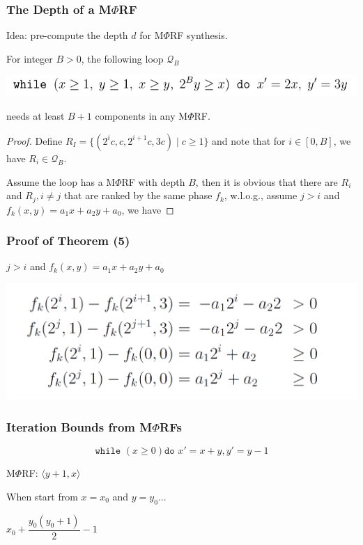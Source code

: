 \documentclass[11pt]{beamer}
\begin{document}
\begin{frame}\frametitle{The Depth of a M$\Phi$RF}
Idea: pre-compute the depth $d$ for M$\Phi$RF synthesis.

\begin{theorem}[5]
For integer $B > 0$, the following loop $\mathcal{Q}_B$
\begin{center}
\includegraphics[scale=0.5]{5.PNG}
\end{center}
needs at least $B + 1$ components in any M$\Phi$RF.
\end{theorem}

\begin{proof}
Define $R_I = \{(2^ic, c, 2^{i+1}c, 3c) \mid c \ge 1 \}$ and note that for $i \in [0,B]$, we have $R_i \in \mathcal{Q}_B$. 

Assume the loop has a M$\Phi$RF with depth $B$, then it is obvious that there are $R_i$ and $R_j, i\ne j$ that are ranked by the same phase $f_k$, w.l.o.g., assume $j > i$ and $f_k(x, y) = a_1 x + a_2 y + a_0$, we have 
 
\end{proof}

\end{frame}

\begin{frame}\frametitle{Proof of Theorem (5)}
$j > i$ and $f_k(x, y) = a_1 x + a_2 y + a_0$
\begin{center}
\includegraphics[scale = 0.3]{9.PNG}
\end{center}

\end{frame}

\begin{frame}\frametitle{Iteration Bounds from M$\Phi$RFs}
\begin{example}
\[\texttt{while }(x \ge 0)\texttt{do } x'= x + y, y' = y - 1\]
\end{example}
M$\Phi$RF: $\langle y + 1, x \rangle $

When start from $x = x_0$ and $y = y_0$...

$x_0 + \dfrac{y_0(y_0 + 1)}{2} - 1$
\end{frame}
\end{document}
